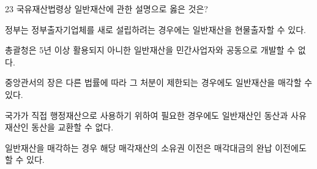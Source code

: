 \begin{question}{23}
국유재산법령상 일반재산에 관한 설명으로 옳은 것은?
\begin{choices}
  \item 정부는 정부출자기업체를 새로 설립하려는 경우에는 일반재산을 현물출자할 수 있다.
  \item 총괄청은 5년 이상 활용되지 아니한 일반재산을 민간사업자와 공동으로 개발할 수 없다.
  \item 중앙관서의 장은 다른 법률에 따라 그 처분이 제한되는 경우에도 일반재산을 매각할 수 있다.
  \item 국가가 직접 행정재산으로 사용하기 위하여 필요한 경우에도 일반재산인 동산과 사유재산인 동산을 교환할 수 없다.
  \item 일반재산을 매각하는 경우 해당 매각재산의 소유권 이전은 매각대금의 완납 이전에도 할 수 있다.
\end{choices}
\end{question}

